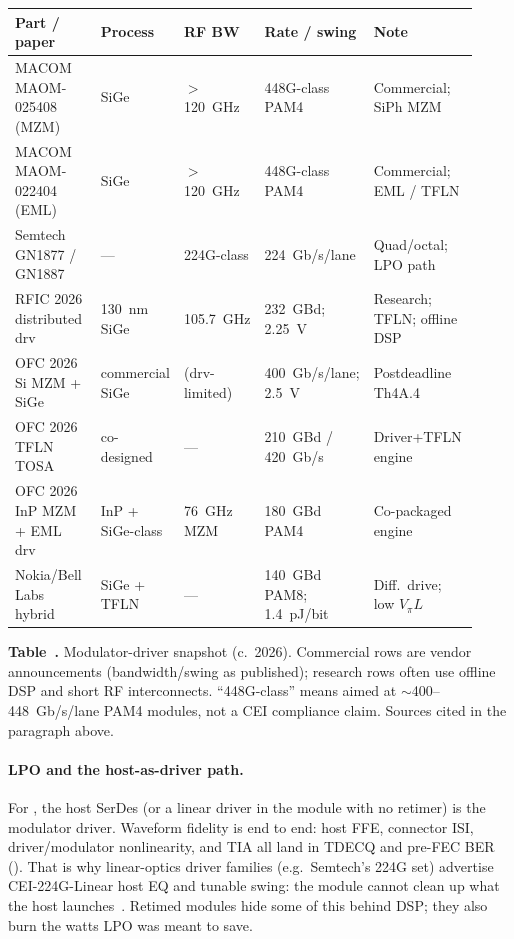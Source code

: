 \begin{table}[ht]
\label{tab:driver-records}%
\centering
\setlength{\tabcolsep}{3pt}%
\footnotesize
\renewcommand{\arraystretch}{1.25}%
\begin{tabular}{@{}p{0.24\linewidth}p{0.12\linewidth}p{0.14\linewidth}p{0.16\linewidth}p{0.26\linewidth}@{}}
\toprule
Part / paper & Process & RF BW & Rate / swing & Note \\
\midrule
MACOM MAOM-025408 (MZM) & SiGe & $>$120~GHz & 448G-class PAM4 & Commercial; SiPh MZM \\
\addlinespace[1.5em]
MACOM MAOM-022404 (EML) & SiGe & $>$120~GHz & 448G-class PAM4 & Commercial; EML / TFLN \\
\addlinespace[1.5em]
Semtech GN1877 / GN1887 & --- & 224G-class & 224~Gb/s/lane & Quad/octal; LPO path \\
\addlinespace[1.5em]
RFIC 2026 distributed drv & 130~nm SiGe & 105.7~GHz & 232~GBd; 2.25~V & Research; TFLN; offline DSP \\
\addlinespace[1.5em]
OFC 2026 Si MZM + SiGe & commercial SiGe & (drv-limited) & 400~Gb/s/lane; 2.5~V & Postdeadline Th4A.4 \\
\addlinespace[1.5em]
OFC 2026 TFLN TOSA & co-designed & --- & 210~GBd / 420~Gb/s & Driver+TFLN engine \\
\addlinespace[1.5em]
OFC 2026 InP MZM + EML drv & InP + SiGe-class & 76~GHz MZM & 180~GBd PAM4 & Co-packaged engine \\
\addlinespace[1.5em]
Nokia/Bell Labs hybrid & SiGe + TFLN & --- & 140~GBd PAM8; 1.4~pJ/bit & Diff.\ drive; low $V_\pi L$ \\
\bottomrule
\end{tabular}
\par\medskip
{\raggedright\footnotesize\textbf{Table~\thetable.} Modulator-driver snapshot (c.~2026).
Commercial rows are vendor announcements (bandwidth/swing as published); research
rows often use offline DSP and short RF interconnects. ``448G-class'' means aimed at
$\sim$400--448~Gb/s/lane PAM4 modules, not a CEI compliance claim. Sources cited in
the paragraph above.\par}
\end{table}

\paragraph{LPO and the host-as-driver path.}
For , the host SerDes (or a linear driver in the module with no retimer)
is the modulator driver. Waveform fidelity is end to end: host FFE, connector ISI,
driver/modulator nonlinearity, and TIA all land in TDECQ and pre-FEC BER
(). That is why linear-optics
driver families (e.g.\ Semtech's 224G set) advertise CEI-224G-Linear host EQ and
tunable swing: the module cannot clean up what the host launches~.
Retimed modules hide some of this behind DSP; they also burn the watts LPO was
meant to save.

